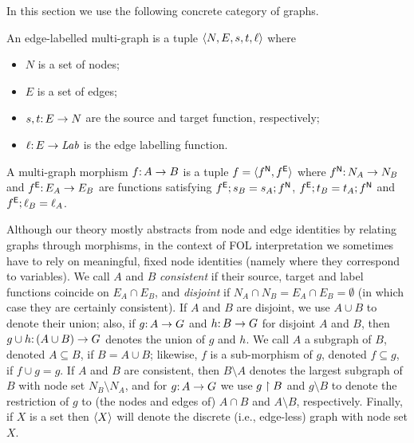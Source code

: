 In this section we use the following concrete category of graphs.
%
\begin{definition}
An edge-labelled multi-graph is a tuple $\langle N,E,s,t,\ell\rangle$ where
\begin{itemize}
\item $N$ is a set of nodes;
\item $E$ is a set of edges;
\item $s,t{:}\, E\rightarrow N$ are the source and target function, respectively;
\item $\ell{:}\, E\rightarrow \mathit{Lab}$ is the edge labelling function.
\end{itemize}
A multi-graph morphism $f{:}\, A\rightarrow B$ is a tuple $f=\langle f^{\mathsf N},f^{\mathsf E}\rangle$ where $f^{\mathsf N}{:}\, N_A\rightarrow N_B$ and $f^{\mathsf E}{:}\, E_A\rightarrow E_B$ are functions satisfying $f^{\mathsf E};s_B=s_A;f^{\mathsf N}$, $f^{\mathsf E};t_B=t_A;f^{\mathsf N}$ and $f^{\mathsf E};\ell_B=\ell_A$.
\end{definition}
%
Although our theory mostly abstracts from node and edge identities by relating graphs through morphisms, in the context of FOL interpretation we sometimes have to rely on meaningful, fixed node identities (namely where they correspond to variables). We call $A$ and $B$ \emph{consistent} if their source, target and label functions coincide on $E_A\cap E_B$, and \emph{disjoint} if $N_A\cap N_B=E_A\cap E_B=\emptyset$ (in which case they are certainly consistent).  If $A$ and $B$ are disjoint, we use $A\cup B$ to denote their union; also, if $g{:}\, A\rightarrow G$ and $h{:}\, B\rightarrow G$ for disjoint $A$ and $B$, then $g\cup h{:}\, (A\cup B)\rightarrow G$ denotes the union of $g$ and $h$. We call $A$ a subgraph of $B$, denoted $A\subseteq B$, if $B=A\cup B$; likewise, $f$ is a sub-morphism of $g$, denoted $f\subseteq g$, if $f\cup g=g$. If $A$ and $B$ are consistent, then $B\setminus A$ denotes the largest subgraph of $B$ with node set $N_B\setminus N_A$, and for $g{:}\, A\rightarrow G$ we use $g\restriction B$ and $g\setminus B$ to denote the restriction of $g$ to (the nodes and edges of) $A \cap B$ and $A\setminus B$, respectively. Finally, if $X$ is a set then $\langle X\rangle$ will denote the discrete (i.e., edge-less) graph with node set $X$.

